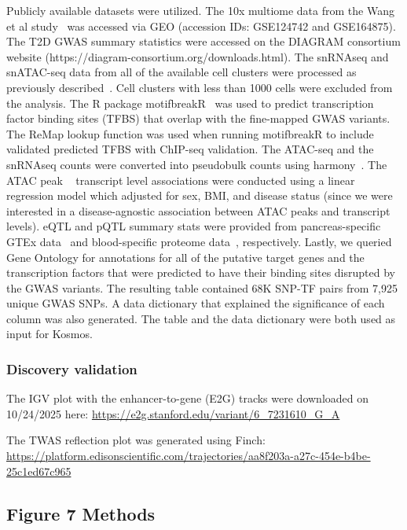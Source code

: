 \documentclass{article}
\begin{document}
Publicly available datasets were utilized. The 10x multiome data from the Wang et al study~\cite{wang_integrating_2023} was accessed via GEO (accession IDs:  GSE124742 and GSE164875). The T2D GWAS summary statistics were accessed on the DIAGRAM consortium website (https://diagram-consortium.org/downloads.html). The snRNAseq and snATAC-seq data from all of the available cell clusters were processed as previously described~\cite{wang_integrating_2023}. Cell clusters with less than 1000 cells were excluded from the analysis. The R package motifbreakR~\cite{coetzee_motifbreakr_2024} was used to predict transcription factor binding sites (TFBS) that overlap with the fine-mapped GWAS variants. The ReMap lookup function was used when running motifbreakR to include validated predicted TFBS with ChIP-seq validation. The ATAC-seq and the snRNAseq counts were converted into pseudobulk counts using harmony~\cite{wang_integrating_2023}. The ATAC peak ~ transcript level  associations were conducted using a linear regression model which adjusted for sex, BMI, and disease status (since we were interested in a disease-agnostic association between ATAC peaks and transcript levels). eQTL and pQTL summary stats were provided from pancreas-specific GTEx data~\cite{the_gtex_consortium_gtex_2020} and blood-specific proteome data~\cite{sun_plasma_2023}, respectively. Lastly, we queried Gene Ontology for annotations for all of the putative target genes and the transcription factors that were predicted to have their binding sites disrupted by the GWAS variants. The resulting table contained 68K SNP-TF pairs from 7,925 unique GWAS SNPs. A data dictionary that explained the significance of each column was also generated. The table and the data dictionary were both used as input for Kosmos.  

\subsubsection{Discovery validation}

The IGV plot with the enhancer-to-gene (E2G)  tracks were downloaded on 10/24/2025 here: \url{https://e2g.stanford.edu/variant/6_7231610_G_A}
 
The TWAS reflection plot was generated using Finch: \url{https://platform.edisonscientific.com/trajectories/aa8f203a-a27c-454e-b4be-25c1ed67c965}

\subsection{Figure 7 Methods}
\end{document}
